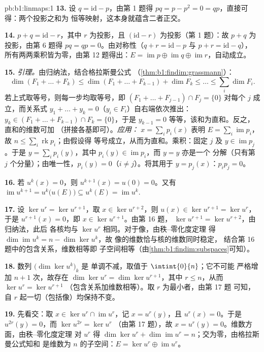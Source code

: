 \begin{solution}{pb:b1:linmaps:1}
\textbf{13.} 设 $q = \mathrm{id} - p$，由第 1 题得 $pq =
p - p^2 = 0 = qp$，直接可得：两个投影之和为
恒等映射，这本身就蕴含二者正交。

\textbf{14.} $p + q = \mathrm{id} - r$，其中 $r$ 为投影，且
$(\mathrm{id} - r)$ 为投影（第 1 题）：故 $p + q$ 为
投影，由第 6 题得 $pq = qp = 0$。由对称性（$q +
r = \mathrm{id} - p$ 与 $p + r = \mathrm{id} - q$），
所有两两乘积皆为零，由第 12 题得出：$E =
\operatorname{im} p \oplus \operatorname{im} q \oplus
\operatorname{im} r$，自动成立。

\textbf{15.} \emph{引理。}由归纳法，结合格拉斯曼公式
（\cref{thm:b1:findim:grassmann}）：
\[
\dim(F_1 + \dots + F_k) \leq \dim(F_1 + \dots + F_{k-1}) + \dim
F_k \leq \dots \leq \sum_i \dim F_i .
\]
若上式取等号，则每一步均取等号，即 $(F_1 + \dots +
F_{j-1}) \cap F_j = \{0\}$ 对每个 $j$ 成立，而关系式 $y_1 +
\dots + y_k = 0$（$y_i \in F_i$）自右端依次推出：$y_k
\in (F_1 + \dots + F_{k-1}) \cap F_k = \{0\}$，于是 $y_{k-1} =
0$ 等等，该和为直和。反之，直和的维数可加
（拼接各基即可）。\emph{应用：}
$x = \sum_i p_i(x)$ 表明 $E = \sum_i \operatorname{im} p_i$，
故 $n \leq \sum_i \operatorname{rk} p_i$；由假设得
等号成立，从而为直和。乘积：固定 $j$ 及 $y \in
\operatorname{im} p_j$。于是 $y = \sum_i p_i(y)$，其中 $p_i(y)
\in \operatorname{im} p_i$，而 $y = y$ 亦是一个
分解（只有第 $j$ 个分量）；由唯一性，$p_i(y)
= 0$（$i \neq j$）。将其用于 $y = p_j(x)$：$p_i p_j = 0$。

\textbf{16.} 若 $u^k(x) = 0$，则 $u^{k+1}(x) = u(0) = 0$。又有
$\operatorname{im} u^{k+1} = u^k\bigl(u(E)\bigr) \subseteq
u^k(E) = \operatorname{im} u^k$.

\textbf{17.} 设 $\ker u^{r} = \ker u^{r+1}$，取 $x \in
\ker u^{r+2}$，则 $u(x) \in \ker u^{r+1} = \ker u^{r}$，于是
$u^{r+1}(x) = 0$，即 $x \in \ker u^{r+1}$。由第 16 题，
$\ker u^{r+1} = \ker u^{r+2}$，由归纳法，此后
各核均与 $\ker u^{r}$ 相同。对于像，由秩--零化度定理
得 $\dim\operatorname{im} u^k = n - \dim\ker u^k$，故
像的维数恰与核的维数同时稳定，
结合第 16 题中的包含关系，维数相等即
子空间相等（由\cref{thm:b1:findim:subspaces}可知）。

\textbf{18.} 数列 $\bigl(\dim\ker u^k\bigr)_k$ 是
单调不减，取值于 $\intint{0}{n}$；它不可能
严格增加 $n + 1$ 次，故存在 $\dim\ker u^{r} = \dim\ker
u^{r+1}$，其中 $r \leq n$，从而 $\ker u^{r} = \ker u^{r+1}$
（包含关系加维数相等）。取 $r$ 为最小者，由第 17 题
可知，自 $r$ 起一切（包括像）均保持不变。

\textbf{19.} 先看交：取 $x \in \ker u^{r} \cap
\operatorname{im} u^{r}$，记 $x = u^{r}(y)$，且 $u^{r}(x) =
0$。于是 $u^{2r}(y) = 0$，而 $\ker u^{2r} = \ker u^{r}$
（由第 17 题），故 $x = u^{r}(y) = 0$。维数方面，由秩--零化度定理
对 $u^{r}$ 得 $\dim\ker u^{r} + \dim\operatorname{im} u^{r}
= n$；交为零，由格拉斯曼公式知和
是维数为 $n$ 的子空间：$E = \ker u^{r} \oplus
\operatorname{im} u^{r}$。


\end{solution}
